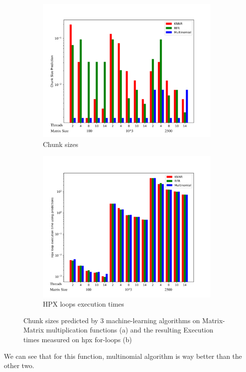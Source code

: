 \begin{figure}[h]
	\centering
	\begin{subfigure}[b]{0.5\textwidth}
		\centering
		\includegraphics[width=\textwidth]{images/bars_matrix_cs.pdf}
		\caption[Network2]%
		{{Chunk sizes}}    
	\end{subfigure}
	\hfill
	\begin{subfigure}[b]{0.49\textwidth}  
		\centering 
		\includegraphics[width=\textwidth]{images/bars_matrix_times.pdf}
		\caption[]%
		{{HPX loops execution times}}    
	\end{subfigure}
	\caption{Chunk sizes predicted by 3 machine-learning algorithms on Matrix-Matrix multiplication functions (a) and the resulting Execution times measured on hpx for-loops (b)} 
\end{figure}
We can see that for this function, multinomial algorithm is way better than the other two. 
\newpage
